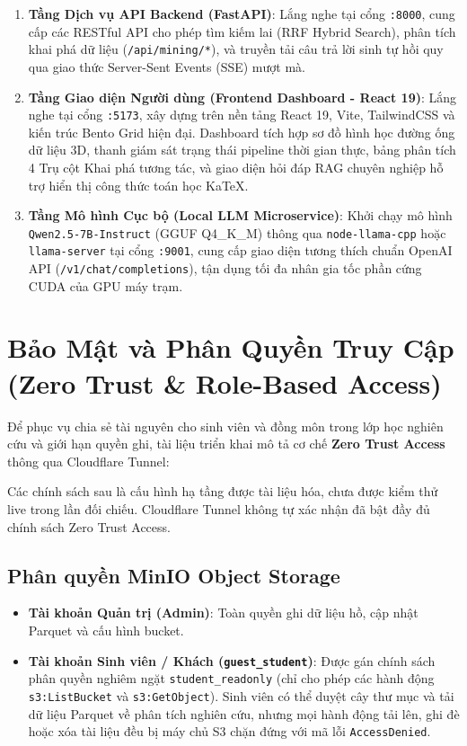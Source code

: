 \begin{enumerate}[label=\textbf{\arabic*.}]
  \item \textbf{Tầng Dịch vụ API Backend (FastAPI)}:
    Lắng nghe tại cổng \texttt{:8000}, cung cấp các RESTful API cho phép tìm kiếm lai (RRF Hybrid Search), phân tích khai phá dữ liệu (\texttt{/api/mining/*}), và truyền tải câu trả lời sinh tự hồi quy qua giao thức Server-Sent Events (SSE) mượt mà.
  \item \textbf{Tầng Giao diện Người dùng (Frontend Dashboard - React 19)}:
    Lắng nghe tại cổng \texttt{:5173}, xây dựng trên nền tảng React 19, Vite, TailwindCSS và kiến trúc Bento Grid hiện đại. Dashboard tích hợp sơ đồ hình học đường ống dữ liệu 3D, thanh giám sát trạng thái pipeline thời gian thực, bảng phân tích 4 Trụ cột Khai phá tương tác, và giao diện hỏi đáp RAG chuyên nghiệp hỗ trợ hiển thị công thức toán học KaTeX.
  \item \textbf{Tầng Mô hình Cục bộ (Local LLM Microservice)}:
    Khởi chạy mô hình \texttt{Qwen2.5-7B-Instruct} (GGUF Q4\_K\_M) thông qua \texttt{node-llama-cpp} hoặc \texttt{llama-server} tại cổng \texttt{:9001}, cung cấp giao diện tương thích chuẩn OpenAI API (\texttt{/v1/chat/completions}), tận dụng tối đa nhân gia tốc phần cứng CUDA của GPU máy trạm.
\end{enumerate}

\section{Bảo Mật và Phân Quyền Truy Cập (Zero Trust \& Role-Based Access)}

Để phục vụ chia sẻ tài nguyên cho sinh viên và đồng môn trong lớp học nghiên cứu và giới hạn quyền ghi, tài liệu triển khai mô tả cơ chế \textbf{Zero Trust Access} thông qua Cloudflare Tunnel:

Các chính sách sau là cấu hình hạ tầng được tài liệu hóa, chưa được kiểm thử live trong lần đối chiếu. Cloudflare Tunnel không tự xác nhận đã bật đầy đủ chính sách Zero Trust Access.
\subsection{Phân quyền MinIO Object Storage}
\begin{itemize}
  \item \textbf{Tài khoản Quản trị (Admin)}: Toàn quyền ghi dữ liệu hồ, cập nhật Parquet và cấu hình bucket.
  \item \textbf{Tài khoản Sinh viên / Khách (\texttt{guest\_student})}: Được gán chính sách phân quyền nghiêm ngặt \lstinline{student_readonly} (chỉ cho phép các hành động \texttt{s3:ListBucket} và \texttt{s3:GetObject}). Sinh viên có thể duyệt cây thư mục và tải dữ liệu Parquet về phân tích nghiên cứu, nhưng mọi hành động tải lên, ghi đè hoặc xóa tài liệu đều bị máy chủ S3 chặn đứng với mã lỗi \texttt{AccessDenied}.
\end{itemize}

